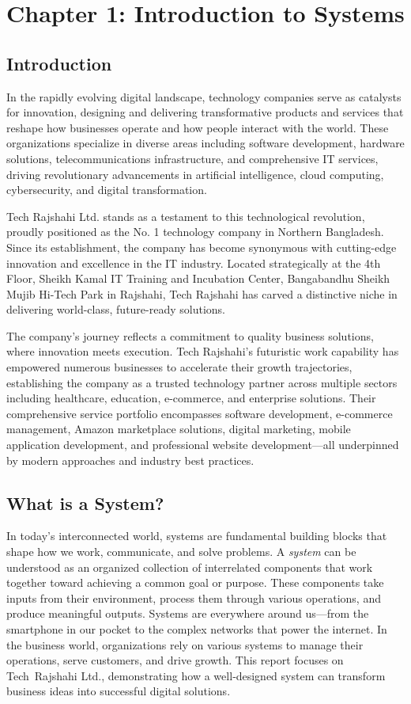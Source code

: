 \documentclass[12pt,a4paper]{article}
\newcommand{\company}[1]{#1}
\newcommand{\skill}[1]{#1}
\begin{document}
\section{Chapter 1: Introduction to Systems}

\subsection{Introduction}

In the rapidly evolving digital landscape, technology companies serve as catalysts for innovation, designing and delivering transformative products and services that reshape how businesses operate and how people interact with the world. These organizations specialize in diverse areas including software development, hardware solutions, telecommunications infrastructure, and comprehensive IT services, driving revolutionary advancements in artificial intelligence, cloud computing, cybersecurity, and digital transformation.

\company{Tech Rajshahi Ltd.} stands as a testament to this technological revolution, proudly positioned as the No. 1 technology company in Northern Bangladesh. Since its establishment, the company has become synonymous with cutting-edge innovation and excellence in the IT industry. Located strategically at the 4th Floor, Sheikh Kamal IT Training and Incubation Center, Bangabandhu Sheikh Mujib Hi-Tech Park in Rajshahi, \company{Tech Rajshahi} has carved a distinctive niche in delivering world-class, future-ready solutions.

The company's journey reflects a commitment to quality business solutions, where innovation meets execution. \company{Tech Rajshahi's} futuristic work capability has empowered numerous businesses to accelerate their growth trajectories, establishing the company as a trusted technology partner across multiple sectors including healthcare, education, e-commerce, and enterprise solutions. Their comprehensive service portfolio encompasses \skill{software development}, \skill{e-commerce management}, \skill{Amazon marketplace solutions}, \skill{digital marketing}, \skill{mobile application development}, and \skill{professional website development}—all underpinned by modern approaches and industry best practices.

\subsection{What is a System?}
In today's interconnected world, systems are fundamental building blocks that shape how we work, communicate, and solve problems. A \emph{system} can be understood as an organized collection of interrelated components that work together toward achieving a common goal or purpose. These components take inputs from their environment, process them through various operations, and produce meaningful outputs.  Systems are everywhere around us—from the smartphone in our pocket to the complex networks that power the internet. In the business world, organizations rely on various systems to manage their operations, serve customers, and drive growth.  This report focuses on Tech Rajshahi Ltd., demonstrating how a well‑designed system can transform business ideas into successful digital solutions.
\end{document}
